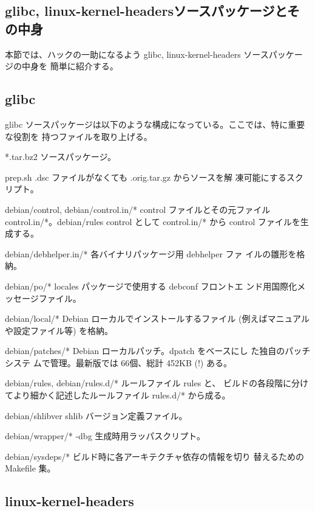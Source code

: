 \documentclass[mingoth]{jsarticle}
\newenvironment{gdescription}%
{%
   \begin{list}{}%
   {%
      \setlength{\itemindent}{0mm}
      \setlength{\leftmargin}{45mm}%
      \setlength{\rightmargin}{0zw}%
      \setlength{\labelsep}{4mm}%
      \setlength{\labelwidth}{4cm}%
      \setlength{\itemsep}{0em}%
      \setlength{\parsep}{0cm}%
      \setlength{\listparindent}{0cm}%
      \let\makelabel\gdescriptionlabel
   }
}{%
   \end{list}%
}
\newcommand*\gdescriptionlabel[1]{\hspace\labelsep\normalfont\bfseries #1}
\begin{document}
\subsection{glibc, linux-kernel-headersソースパッケージとその中身}

  本節では、ハックの一助になるよう glibc, linux-kernel-headers ソースパッケージの中身を
  簡単に紹介する。

\subsection{glibc}

  glibc ソースパッケージは以下のような構成になっている。ここでは、特に重要な役割を
  持つファイルを取り上げる。

    \begin{gdescription}
      \item[*.tar.bz2] ソースパッケージ。
      \item[prep.sh] .dsc ファイルがなくても .orig.tar.gz からソースを解
		 凍可能にするスクリプト。
      \item[debian/control, debian/control.in/*] control ファイルとその元ファイル
	control.in/*。debian/rules control として control.in/* から control ファイルを生成する。
      \item[debian/debhelper.in/*] 各バイナリパッケージ用 debhelper ファ
		 イルの雛形を格納。
      \item[debian/po/*] locales パッケージで使用する debconf フロントエ
		 ンド用国際化メッセージファイル。
      \item[debian/local/*] Debian ローカルでインストールするファイル (例えばマニュアルや設定ファイル等) を格納。
      \item[debian/patches/*] Debian ローカルパッチ。dpatch をベースにし
		 た独自のパッチシステ
		 ムで管理。最新版では 66個、総計 452KB (!) ある。
      \item[debian/rules, debian/rules.d/*] ルールファイル rules と、
		 ビルドの各段階に分けてより細かく記述したルールファイル
		 rules.d/* から成る。
      \item[debian/shlibver] shlib バージョン定義ファイル。
      \item[debian/wrapper/*] -dbg 生成時用ラッパスクリプト。
      \item[debian/sysdeps/*] ビルド時に各アーキテクチャ依存の情報を切り
		 替えるための Makefile 集。
    \end{gdescription}

\subsection{linux-kernel-headers}
\end{document}
